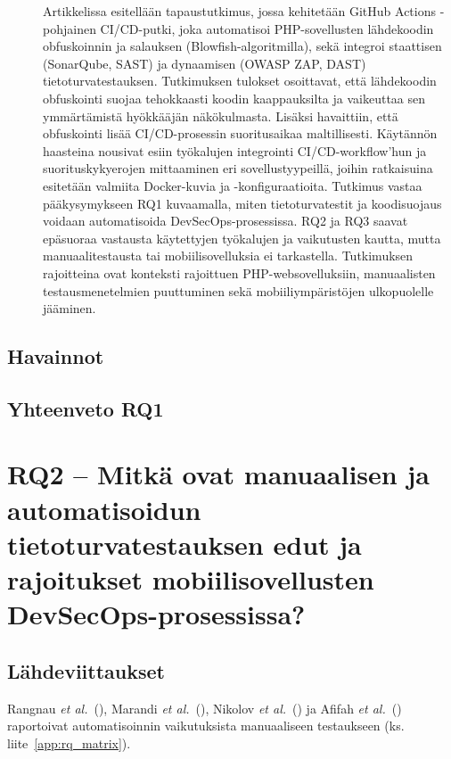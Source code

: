 \documentclass[bscthesis,finnish,oneside,biblatex]{uefcsthesis}
\begin{document}
\begin{description}
    \item[\cite{afifah2024_coi}] Artikkelissa esitellään tapaustutkimus, jossa kehitetään GitHub Actions -pohjainen CI/CD-putki, joka automatisoi
    PHP-sovellusten lähdekoodin obfuskoinnin ja salauksen (Blowfish-algoritmilla), sekä integroi staattisen (SonarQube, SAST) ja dynaamisen
    (OWASP ZAP, DAST) tietoturvatestauksen. Tutkimuksen tulokset osoittavat, että lähdekoodin obfuskointi suojaa tehokkaasti koodin kaappauksilta
    ja vaikeuttaa sen ymmärtämistä hyökkääjän näkökulmasta. Lisäksi havaittiin, että obfuskointi lisää CI/CD-prosessin suoritusaikaa maltillisesti.
    Käytännön haasteina nousivat esiin työkalujen integrointi CI/CD-workflow’hun ja suorituskykyerojen mittaaminen eri sovellustyypeillä, joihin
    ratkaisuina esitetään valmiita Docker-kuvia ja -konfiguraatioita. Tutkimus vastaa pääkysymykseen RQ1 kuvaamalla, miten tietoturvatestit ja
    koodisuojaus voidaan automatisoida DevSecOps-prosessissa. RQ2 ja RQ3 saavat epäsuoraa vastausta käytettyjen työkalujen ja vaikutusten kautta,
    mutta manuaalitestausta tai mobiilisovelluksia ei tarkastella. Tutkimuksen rajoitteina ovat konteksti rajoittuen PHP-websovelluksiin,
    manuaalisten testausmenetelmien puuttuminen sekä mobiiliympäristöjen ulkopuolelle jääminen.
\end{description}

\subsection{Havainnot}

\subsection{Yhteenveto RQ1}

\section{RQ2 – Mitkä ovat manuaalisen ja automatisoidun tietoturvatestauksen edut ja rajoitukset mobiilisovellusten DevSecOps-prosessissa?}
\label{sec:rq2}

\subsection{Lähdeviittaukset}
Rangnau \emph{et al.}\ (\citeyear{rangnau2020_cst}),
Marandi \emph{et al.}\ (\citeyear{marandi2023_ias}),
Nikolov \emph{et al.}\ (\citeyear{nikolov2024_fit}) ja
Afifah \emph{et al.}\ (\citeyear{afifah2024_coi}) raportoivat automatisoinnin
vaikutuksista manuaaliseen testaukseen (ks. liite~\ref{app:rq_matrix}).
\end{document}

